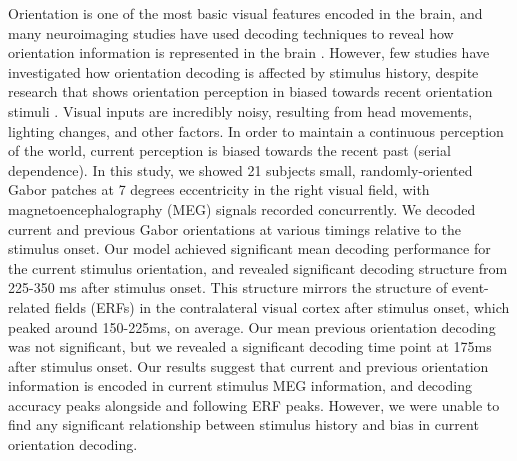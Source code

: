 \documentclass[../main.tex]{subfiles}
\begin{document}
Orientation is one of the most basic visual features encoded in the brain, and many neuroimaging studies have used decoding techniques to reveal how orientation information is represented in the brain \citep{haynes_rees_2005, kamitani_tong_2005, GARCIA2013515, cichy_ramirez_pantazis_2015}. However, few studies have investigated how orientation decoding is affected by stimulus history, despite research that shows orientation perception in biased towards recent orientation stimuli \citep{fischer_whitney_2014}. Visual inputs are incredibly noisy, resulting from head movements, lighting changes, and other factors. In order to maintain a continuous perception of the world, current perception is biased towards the recent past (serial dependence). In this study, we showed 21 subjects small, randomly-oriented Gabor patches at 7 degrees eccentricity in the right visual field, with magnetoencephalography (MEG) signals recorded concurrently. We decoded current and previous Gabor orientations at various timings relative to the stimulus onset. Our model achieved significant mean decoding performance for the current stimulus orientation, and revealed significant decoding structure from 225-350 ms after stimulus onset. This structure mirrors the structure of event-related fields (ERFs) in the contralateral visual cortex after stimulus onset, which peaked around 150-225ms, on average. Our mean previous orientation decoding was not significant, but we revealed a significant decoding time point at 175ms after stimulus onset. Our results suggest that current and previous orientation information is encoded in current stimulus MEG information, and decoding accuracy peaks alongside and following ERF peaks. However, we were unable to find any significant relationship between stimulus history and bias in current orientation decoding.
\end{document}
